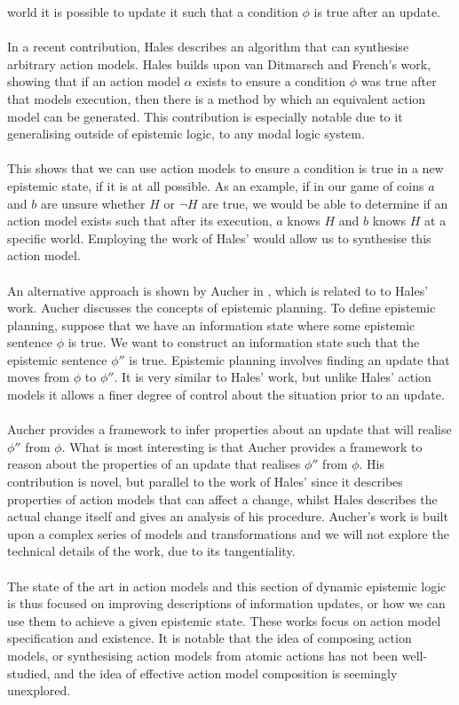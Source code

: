 world it is possible to update it such that a condition $\phi$ is true after an
update.\\
\\
In a recent contribution, Hales \cite{hales13synthesis} describes an algorithm that can synthesise arbitrary
action models.
Hales builds upon van Ditmarsch and French's work, showing that if an action
model $\alpha$ exists to ensure a condition $\phi$ was true after that models
execution, then there is a method by which an equivalent action model can be generated.
This contribution is especially notable due to it generalising outside of
epistemic logic, to any modal logic system.\\
\\
This shows that we can use action models to ensure a condition is true
in a new epistemic state, if it is at all possible.
As an example, if in our game of coins $a$ and $b$ are unsure whether $H$ or $\neg H$
are true, we would be able to determine if an action model exists such that
after its execution, $a$ knows $H$ and $b$ knows $H$ at a specific world.
Employing the work of Hales' would allow us to synthesise this action model.\\
\\
An alternative approach is shown by Aucher in
\cite{doi:10.3166/jancl.21.289-321,doi:10.1080/11663081.2012.736703}, which is related to
to Hales' work.
Aucher discusses the concepts of epistemic planning.
To define epistemic planning, suppose that we have an information state where
some epistemic sentence $\phi$ is true.
We want to construct an information state such that the epistemic sentence
$\phi''$ is true.
Epistemic planning involves finding an update that moves from $\phi$ to
$\phi''$.
It is very similar to Hales' work, but unlike Hales' action models it allows a
finer degree of control about the situation prior to an update.\\
\\
Aucher provides a framework to infer properties about an update that will
realise $\phi''$ from $\phi$.
What is most interesting is that Aucher provides a framework to reason about the
properties of an update that realises $\phi''$ from $\phi$.
His contribution is novel, but parallel to the work of Hales' since it describes
properties of action models that can affect a change, whilst Hales describes the actual change itself and gives
an analysis of his procedure.
Aucher's work is built upon a complex series of models and transformations and we will not explore
the technical details of the work, due to its tangentiality.\\
\\
The state of the art in action models and this section of dynamic epistemic
logic is thus focused on improving descriptions of information updates, or how
we can use them to achieve a given epistemic state.
These works focus on action model specification and existence.
It is notable that the idea of composing action models, or synthesising action models from atomic
actions has not been well-studied, and the idea of effective action model composition is seemingly
unexplored.

